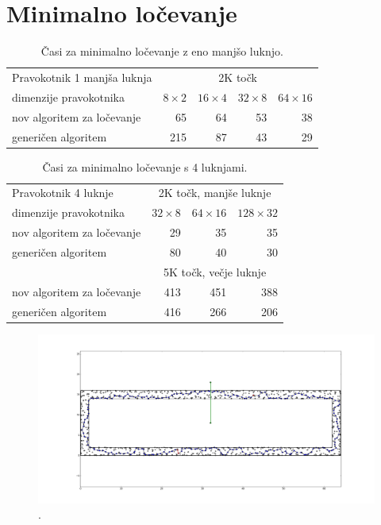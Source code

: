\documentclass[a4paper, 12pt]{book}
\begin{document}
\section{Minimalno ločevanje}
\begin{table}[h!]
\begin{center}
\begin{tabular}{l*{4}{r}}
Pravokotnik 1 manjša luknja & \multicolumn{4}{c}{2K točk}\\
dimenzije pravokotnika	&	$8\times 2$	&	$16\times 4$	&	$32\times 8$ & $64\times 16$ \\	
\hline
nov algoritem za ločevanje	&	65	&	64	&	53	&	38  \\
generičen algoritem			&	215	&	87	&	43	&	29
\end{tabular}
\caption{Časi za minimalno ločevanje z eno manjšo luknjo.}
\label{table6}
\end{center}
\end{table}

\begin{table}[h!]
\begin{center}
\begin{tabular}{l*{3}{r}}
Pravokotnik 4 luknje & \multicolumn{3}{c}{2K točk, manjše luknje} \\
dimenzije pravokotnika	&	$32\times 8$ &	$64\times 16$ & $128\times 32$ \\	
\hline
nov algoritem za ločevanje	&	29	&	35	&	35	\\
generičen algoritem			&	80	&	40	&	30	\\
\hline
& \multicolumn{3}{c}{5K točk, večje luknje} \\
\hline
nov algoritem za ločevanje &	413 & 451 & 388  \\
generičen algoritem &	416 & 266 & 206
\end{tabular}
\caption{Časi za minimalno ločevanje s 4 luknjami.}
\label{table7}
\end{center}
\end{table}

\begin{figure}
\centerline{\includegraphics[scale=0.3]{pics/separation-64-1-1000-narrow-2.png}}
\caption{. }
\label{sep-64-1-1000-narrow}
\end{figure}
\end{document}
